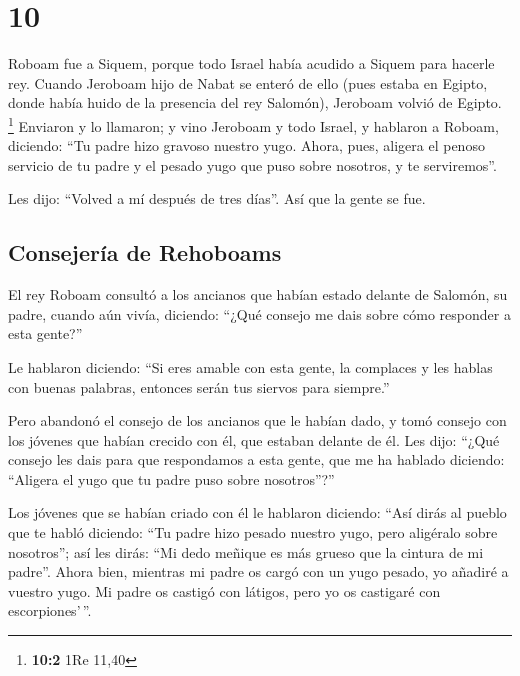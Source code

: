 \hypertarget{section-9}{%
\section{10}\label{section-9}}

 Roboam fue a Siquem, porque todo Israel había acudido a
Siquem para hacerle rey.  Cuando Jeroboam hijo de Nabat se
enteró de ello (pues estaba en Egipto, donde había huido de la presencia
del rey Salomón), Jeroboam volvió de Egipto. \footnote{\textbf{10:2} 1Re
  11,40}  Enviaron y lo llamaron; y vino Jeroboam y todo
Israel, y hablaron a Roboam, diciendo:  ``Tu padre hizo
gravoso nuestro yugo. Ahora, pues, aligera el penoso servicio de tu
padre y el pesado yugo que puso sobre nosotros, y te serviremos''.

 Les dijo: ``Volved a mí después de tres días''. Así que
la gente se fue.

\hypertarget{consejeruxeda-de-rehoboams}{%
\subsection{Consejería de Rehoboams}\label{consejeruxeda-de-rehoboams}}

 El rey Roboam consultó a los ancianos que habían estado
delante de Salomón, su padre, cuando aún vivía, diciendo: ``¿Qué consejo
me dais sobre cómo responder a esta gente?''

 Le hablaron diciendo: ``Si eres amable con esta gente, la
complaces y les hablas con buenas palabras, entonces serán tus siervos
para siempre.''

 Pero abandonó el consejo de los ancianos que le habían
dado, y tomó consejo con los jóvenes que habían crecido con él, que
estaban delante de él.  Les dijo: ``¿Qué consejo les dais
para que respondamos a esta gente, que me ha hablado diciendo: ``Aligera
el yugo que tu padre puso sobre nosotros''?''

 Los jóvenes que se habían criado con él le hablaron
diciendo: ``Así dirás al pueblo que te habló diciendo: ``Tu padre hizo
pesado nuestro yugo, pero aligéralo sobre nosotros''; así les dirás:
``Mi dedo meñique es más grueso que la cintura de mi padre''.
 Ahora bien, mientras mi padre os cargó con un yugo
pesado, yo añadiré a vuestro yugo. Mi padre os castigó con látigos, pero
yo os castigaré con escorpiones'\,''.

